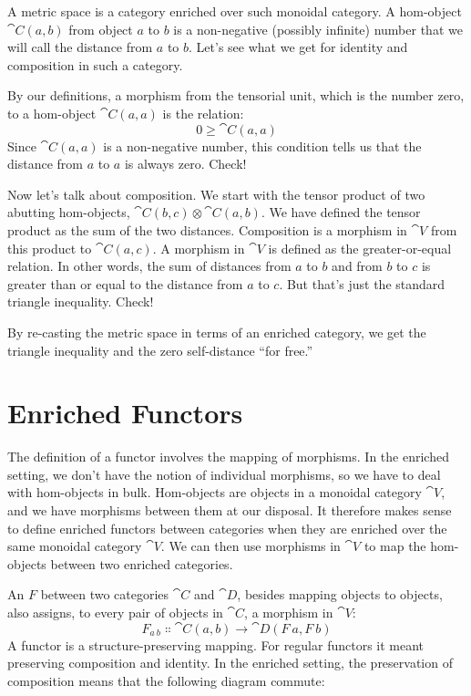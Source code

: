A metric space is a category enriched over such monoidal category. A
hom-object $\cat{C}(a, b)$ from object $a$ to $b$ is a
non-negative (possibly infinite) number that we will call the distance
from $a$ to $b$. Let's see what we get for identity and
composition in such a category.

By our definitions, a morphism from the tensorial unit, which is the
number zero, to a hom-object $\cat{C}(a, a)$ is the relation:
\[0 \geqslant \cat{C}(a, a)\]
Since $\cat{C}(a, a)$ is a non-negative number, this condition tells
us that the distance from $a$ to $a$ is always zero.
Check!

Now let's talk about composition. We start with the tensor product of
two abutting hom-objects, $\cat{C}(b, c) \otimes \cat{C}(a, b)$. We have defined
the tensor product as the sum of the two distances. Composition is a
morphism in $\cat{V}$ from this product to $\cat{C}(a, c)$. A morphism
in $\cat{V}$ is defined as the greater-or-equal relation. In other words,
the sum of distances from $a$ to $b$ and from $b$
to $c$ is greater than or equal to the distance from $a$
to $c$. But that's just the standard triangle inequality. Check!

By re-casting the metric space in terms of an enriched category, we get
the triangle inequality and the zero self-distance ``for free.''

\section{Enriched Functors}

The definition of a functor involves the mapping of morphisms. In the
enriched setting, we don't have the notion of individual morphisms, so
we have to deal with hom-objects in bulk. Hom-objects are objects in a
monoidal category $\cat{V}$, and we have morphisms between them at our
disposal. It therefore makes sense to define enriched functors between
categories when they are enriched over the same monoidal category
$\cat{V}$. We can then use morphisms in $\cat{V}$ to map the hom-objects
between two enriched categories.

An  $F$ between two categories $\cat{C}$
and $\cat{D}$, besides mapping objects to objects, also assigns, to every
pair of objects in $\cat{C}$, a morphism in $\cat{V}$:
\[F_{a\ b} \Colon \cat{C}(a, b) \to \cat{D}(F\ a, F\ b)\]
A functor is a structure-preserving mapping. For regular functors it
meant preserving composition and identity. In the enriched setting, the
preservation of composition means that the following diagram commute:

